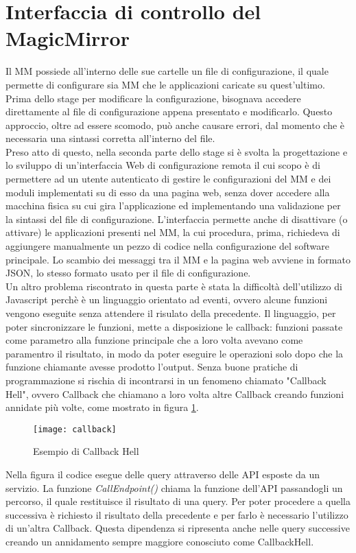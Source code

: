 \section{Interfaccia di controllo del MagicMirror}\label{cap:interfacciaproblemi}
Il MM possiede all'interno delle sue cartelle un file di configurazione, il quale permette
di configurare sia MM che le applicazioni caricate su quest'ultimo.
Prima dello stage per modificare la configurazione, bisognava accedere direttamente al file di configurazione
appena presentato e modificarlo. Questo approccio, oltre ad essere scomodo, pu\`o anche
causare errori, dal momento che \`e necessaria una sintassi corretta all'interno del file.\\[1\baselineskip]
Preso atto di questo, nella seconda parte dello stage si \`e svolta la progettazione e lo sviluppo di un'interfaccia Web di configurazione remota
il cui scopo \`e di permettere ad un utente autenticato di gestire
le configurazioni del MM e dei moduli implementati su di esso da una pagina web,
senza dover accedere alla macchina fisica su cui gira l'applicazione ed implementando
una validazione per la sintassi del file di configurazione.
L'interfaccia permette anche di disattivare (o attivare) le applicazioni presenti nel MM,
la cui procedura, prima, richiedeva di aggiungere manualmente un pezzo di codice nella
configurazione del software principale.
Lo scambio dei messaggi tra il MM e la pagina web avviene in formato JSON, lo stesso formato
usato per il file di configurazione.\\
Un altro problema riscontrato in questa parte \`e stata la difficolt\`a dell'utilizzo di Javascript
perch\`e \`e un linguaggio orientato ad eventi, ovvero alcune funzioni vengono eseguite senza attendere
il risulato della precedente. Il linguaggio, per poter sincronizzare le funzioni, mette a disposizione
le callback: funzioni passate come parametro alla funzione principale che a loro volta avevano come paramentro il risultato,
in modo da poter eseguire le operazioni solo dopo che la funzione chiamante avesse prodotto l'output.
Senza buone pratiche di programmazione si rischia di incontrarsi in un fenomeno chiamato "Callback Hell", ovvero Callback che chiamano a loro volta
altre Callback creando funzioni annidate pi\`u volte, come mostrato in figura \ref{fig:hell}.
\begin{figure}[H]
    \texttt{[image: callback]}
    \caption{Esempio di Callback Hell}
    \label{fig:hell}
\end{figure}
Nella figura il codice esegue delle query attraverso delle API esposte da un servizio. La funzione \textit{CallEndpoint()} chiama la funzione dell'API passandogli
un percorso, il quale restituisce il risultato di una query. Per poter procedere a quella successiva \`e richiesto il risultato della precedente e
per farlo \`e necessario l'utilizzo di un'altra Callback. Questa dipendenza si ripresenta anche nelle query successive creando un annidamento
sempre maggiore conosciuto come CallbackHell.
